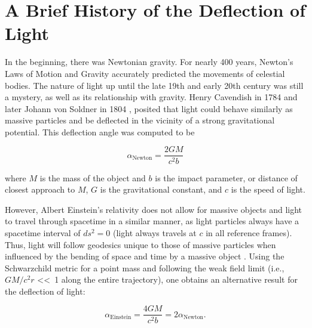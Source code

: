 \section{A Brief History of the Deflection of Light}

In the beginning, there was Newtonian gravity. For nearly 400 years, Newton's Laws of Motion and Gravity accurately predicted the movements of celestial bodies. The nature of light up until the late 19th and early 20th century was still a mystery, as well as its relationship with gravity. Henry Cavendish in 1784 \citep{Cavendish:2011ts} and later Johann von Soldner in 1804 \citep{Jaki:1978wc}, posited that light could behave similarly as massive particles and be deflected in the vicinity of a strong gravitational potential. This deflection angle was computed to be

\begin{equation}
\alpha_\mathrm{Newton} = \frac{2GM}{c^2b}
\end{equation}

\noindent where $M$ is the mass of the object and $b$ is the impact parameter, or distance of closest approach to $M$, $G$ is the gravitational constant, and $c$ is the speed of light.

However, Albert Einstein's relativity does not allow for massive objects and light to travel through spacetime in a similar manner, as light particles always have a spacetime interval of $ds^2=0$ (light always travels at $c$ in all reference frames). Thus, light will follow geodesics unique to those of massive particles when influenced by the bending of space and time by a massive object \citep{Einstein:1911rf}. Using the Schwarzchild metric for a point mass and following the weak field limit (i.e., $GM/c^2r$ \textless \textless\ 1 along the entire trajectory), one obtains an alternative result for the deflection of light:

\begin{equation}
\alpha_\mathrm{Einstein} = \frac{4GM}{c^2b} =  2\alpha_\mathrm{Newton}.
\label{intro:eqn:deflection}
\end{equation}

